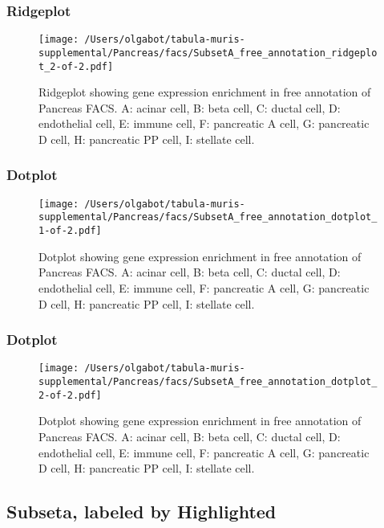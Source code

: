 \subsubsection{Ridgeplot}
\begin{figure}[h]
\centering
\texttt{[image: /Users/olgabot/tabula-muris-supplemental/Pancreas/facs/SubsetA\_free\_annotation\_ridgeplot\_2-of-2.pdf]}

\caption{ Ridgeplot  showing gene expression enrichment in free annotation of Pancreas FACS. A: acinar cell, B: beta cell, C: ductal cell, D: endothelial cell, E: immune cell, F: pancreatic A cell, G: pancreatic D cell, H: pancreatic PP cell, I: stellate cell.}
\end{figure}


\clearpage
\clearpage
\subsubsection{Dotplot}
\begin{figure}[h]
\centering
\texttt{[image: /Users/olgabot/tabula-muris-supplemental/Pancreas/facs/SubsetA\_free\_annotation\_dotplot\_1-of-2.pdf]}

\caption{ Dotplot  showing gene expression enrichment in free annotation of Pancreas FACS. A: acinar cell, B: beta cell, C: ductal cell, D: endothelial cell, E: immune cell, F: pancreatic A cell, G: pancreatic D cell, H: pancreatic PP cell, I: stellate cell.}
\end{figure}


\clearpage
\clearpage
\subsubsection{Dotplot}
\begin{figure}[h]
\centering
\texttt{[image: /Users/olgabot/tabula-muris-supplemental/Pancreas/facs/SubsetA\_free\_annotation\_dotplot\_2-of-2.pdf]}

\caption{ Dotplot  showing gene expression enrichment in free annotation of Pancreas FACS. A: acinar cell, B: beta cell, C: ductal cell, D: endothelial cell, E: immune cell, F: pancreatic A cell, G: pancreatic D cell, H: pancreatic PP cell, I: stellate cell.}
\end{figure}


\clearpage
\subsection{Subseta, labeled by Highlighted}


